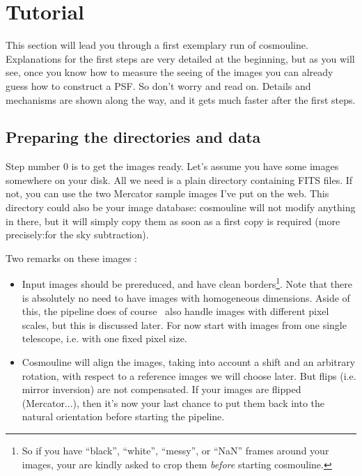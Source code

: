

\section{Tutorial}


This section will lead you through a first exemplary run of cosmouline. Explanations for the first steps are very detailed at the beginning, but as you will see, once you know how to measure the seeing of the images you can already guess how to construct a PSF.
So don't worry and read on. Details and mechanisms are shown along the way, and it gets much faster after the first steps.


\subsection{Preparing the directories and data}

Step number 0 is to get the images ready. Let's assume you have some images somewhere on your disk. All we need is a plain directory containing FITS files. If not, you can use the two Mercator sample images I've put on the web. This directory could also be your image database: cosmouline will not modify anything in there, but it will simply copy them as soon as a first copy is required (more precisely:for the sky subtraction).


Two remarks on these images :

\begin{itemize}

\item Input images should be prereduced, and have clean borders\footnote{So if you have ``black'', ``white'', ``messy'', or ``NaN'' frames around your images, your are kindly asked to crop them \emph{before} starting cosmouline.}.
Note that there is absolutely no need to have images with homogeneous dimensions. Aside of this, the pipeline does of course \smiley\, also handle images with different pixel scales, but this is discussed later. For now start with images from one single telescope, i.e. with one fixed pixel size.

\item Cosmouline will align the images, taking into account a shift and an arbitrary rotation, with respect to a reference images we will choose later. But flips (i.e. mirror inversion) are not compensated. If your images are flipped (Mercator...), then it's now your last chance to put them back into the natural orientation before starting the pipeline.

\end{itemize}

